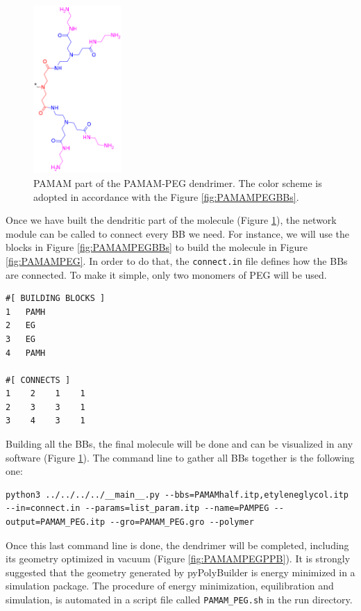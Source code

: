 \begin{figure}
    \centering
    \includegraphics[width=0.3\textwidth]{PAMAM_PEG/PAMAMPEGHalf.png}
    \caption{PAMAM part of the PAMAM-PEG dendrimer. The color scheme is adopted in accordance with the Figure \ref{fig:PAMAMPEGBBs}.}
    \label{fig:PAMAMPEGHalf}
\end{figure}

Once we have built the dendritic part of the molecule (Figure \ref{fig:PAMAMPEGHalf}), the network module can be called to connect every BB we need.
For instance, we will use the blocks in Figure \ref{fig:PAMAMPEGBBs} to build the molecule in Figure \ref{fig:PAMAMPEG}.
In order to do that, the \texttt{connect.in} file defines how the BBs are connected.
To make it simple, only two monomers of PEG will be used.

\begin{lstlisting}
#[ BUILDING BLOCKS ]
1   PAMH
2   EG
3   EG
4   PAMH

#[ CONNECTS ]
1    2    1    1
2    3    3    1
3    4    3    1

\end{lstlisting}

Building all the BBs, the final molecule will be done and can be visualized in any software (Figure \ref{fig:PAMAMPEGHalf}).
The command line to gather all BBs together is the following one:

\begin{lstlisting}
python3 ../../../../__main__.py --bbs=PAMAMhalf.itp,etyleneglycol.itp --in=connect.in --params=list_param.itp --name=PAMPEG --output=PAMAM_PEG.itp --gro=PAMAM_PEG.gro --polymer
\end{lstlisting}

Once this last command line is done, the dendrimer will be completed, including its geometry optimized in vacuum (Figure \ref{fig:PAMAMPEGPPB}).
It is strongly suggested that the geometry generated by pyPolyBuilder is energy minimized in a simulation package.
The procedure of energy minimization, equilibration and simulation, is automated in a script file called \texttt{PAMAM\_PEG.sh} in the run directory.


